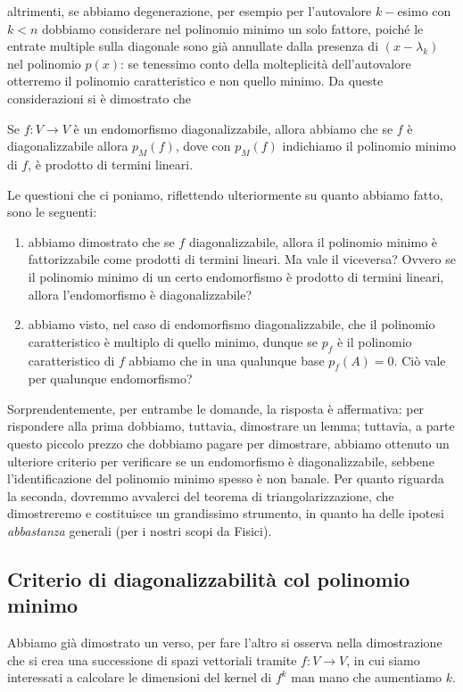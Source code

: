 altrimenti, se abbiamo degenerazione, per esempio per l'autovalore $k-$esimo con $k < n$ dobbiamo considerare nel polinomio minimo un solo fattore, poiché le entrate multiple sulla diagonale sono già annullate dalla presenza di $(x - \lambda_k)$ nel polinomio $p(x)$: se tenessimo conto della molteplicità
dell'autovalore otterremo il polinomio caratteristico e non quello minimo. Da queste considerazioni si è dimostrato che
\begin{prop}
    Se $f : V \to V$ è un endomorfismo diagonalizzabile, allora abbiamo che se $f$ è diagonalizzabile allora $p_M(f)$, dove con $p_M(f)$ indichiamo il polinomio minimo di $f$, è prodotto di termini lineari.
\end{prop}
Le questioni che ci poniamo, riflettendo ulteriormente su quanto abbiamo fatto, sono le seguenti:
\begin{enumerate}[label=\protect\circled{\arabic*}]
    \item abbiamo dimostrato che se $f$ diagonalizzabile, allora il polinomio minimo è fattorizzabile come prodotti di termini lineari. Ma vale il viceversa? Ovvero se il polinomio minimo di un certo endomorfismo è prodotto di termini lineari, allora l'endomorfismo è diagonalizzabile?
    \item abbiamo visto, nel caso di endomorfismo diagonalizzabile, che il polinomio caratteristico è multiplo di quello minimo, dunque se $p_f$ è il polinomio caratteristico di $f$ abbiamo che in una qualunque base $p_f(A) = 0$. Ciò vale per qualunque endomorfismo?
\end{enumerate}
Sorprendentemente, per entrambe le domande, la risposta è affermativa: per rispondere alla prima dobbiamo, tuttavia, dimostrare un lemma; tuttavia, a parte questo piccolo prezzo che dobbiamo pagare per dimostrare, abbiamo ottenuto un ulteriore criterio per verificare se un endomorfismo è diagonalizzabile, sebbene l'identificazione
del polinomio minimo spesso è non banale. Per quanto riguarda la seconda, dovremmo avvalerci del teorema di triangolarizzazione, che dimostreremo e costituisce un grandissimo strumento, in quanto ha delle ipotesi \emph{abbastanza} generali (per i nostri scopi da Fisici).

\subsection{Criterio di diagonalizzabilità col polinomio minimo}

Abbiamo già dimostrato un verso, per fare l'altro si osserva nella dimostrazione che si crea una successione di spazi vettoriali tramite $f : V \to V$, in cui siamo interessati a calcolare le dimensioni del kernel di $f^k$ man mano che aumentiamo $k$. 
